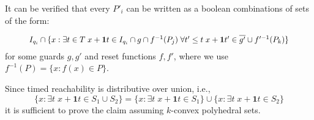 \documentclass[table]{beamer}
\begin{document}
\begin{frame}
	It can be verified that every $P'_i$ can be written as a boolean combinations of sets of the form:

	\begin{equation*}
		\resizebox{.9\hsize}{!}{
			$I_{q_i} \cap \{x : \exists t \in T \;  x+\textbf{1}t \in I_{q_i} \cap g \cap f^{-1}(P_j)\; \forall t' \leq t \; x+\textbf{1}t' \in \overline{g'} \cup f'^{-1}(P_k)\}$
		}
	\end{equation*}
	for some guards $g,g'$ and reset functions $f,f'$, where we use $f^{-1}(P)=\{x : f(x) \in P\}$.

	\medskip
	
	Since timed reachability is distributive over union, i.e.,
	$$\{x:\exists t\;x+\textbf{1}t \in S_1 \cup S_2\} = \{x:\exists t\;x+\textbf{1}t \in S_1\} \cup \{x:\exists t\;x+\textbf{1}t \in S_2\}$$
	it is sufficient to prove the claim assuming $k$-convex polyhedral sets.

\end{frame}
\end{document}
